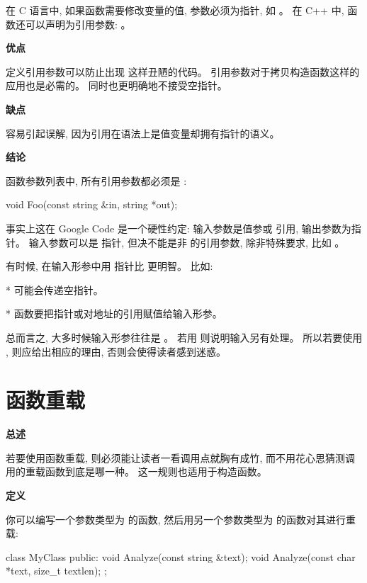 在 C 语言中, 如果函数需要修改变量的值, 参数必须为指针, 如 。 在 C++ 中, 函数还可以声明为引用参数: 。

\textbf{优点}

定义引用参数可以防止出现  这样丑陋的代码。 引用参数对于拷贝构造函数这样的应用也是必需的。 同时也更明确地不接受空指针。

\textbf{缺点}

容易引起误解, 因为引用在语法上是值变量却拥有指针的语义。

\textbf{结论}

函数参数列表中, 所有引用参数都必须是 :

\begin{cppcode}
  void Foo(const string &in, string *out);
\end{cppcode}

事实上这在 Google Code 是一个硬性约定: 输入参数是值参或  引用, 输出参数为指针。 输入参数可以是  指针, 但决不能是非  的引用参数, 除非特殊要求, 比如 。

有时候, 在输入形参中用  指针比  更明智。 比如:

* 可能会传递空指针。

* 函数要把指针或对地址的引用赋值给输入形参。

总而言之, 大多时候输入形参往往是 。 若用  则说明输入另有处理。 所以若要使用 , 则应给出相应的理由, 否则会使得读者感到迷惑。

\section{函数重载} \label{function-overloading}

\textbf{总述}

若要使用函数重载, 则必须能让读者一看调用点就胸有成竹, 而不用花心思猜测调用的重载函数到底是哪一种。 这一规则也适用于构造函数。

\textbf{定义}

你可以编写一个参数类型为  的函数, 然后用另一个参数类型为  的函数对其进行重载:


\begin{cppcode}
  class MyClass {
      public:
      void Analyze(const string &text);
      void Analyze(const char *text, size_t textlen);
    };
\end{cppcode}

